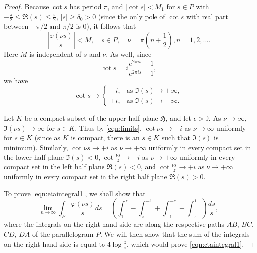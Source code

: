 \documentclass{article}
\begin{document}
\begin{proof}
Because $\cot{s}$ has period $\pi$, and $|\cot{s}|<M_1$ for $s\in P$ with $-\frac{\pi}{2} \leq \Re(s) \leq \frac{\pi}{2}$, $|s| \geq \delta_0>0$ (since the only pole of $\cot{s}$ with real part between $-\pi/2$ and $\pi/2$ is $0$), it follows that
\begin{equation}
\label{eqn:inequality}
|\frac{\varphi(\nu s)}{s}|<M, \quad s \in P, \quad \nu=\pi(n+\frac{1}{2}), n=1,2,\ldots.
\end{equation}
Here $M$ is independent of $s$ and $\nu$.
As well, since
\[
\cot s=i\frac{e^{2\pi is}+1}{e^{2\pi is}-1},
\]
we have
\begin{equation}
\label{eqn:limits}
\cot s \to \begin{cases}-i,&\textrm{as $\Im(s) \to +\infty$},\\
+i,&\textrm{as $\Im(s) \to -\infty$}.\end{cases}
\end{equation}

Let $K$ be a compact subset of the upper half plane $\mathfrak{H}$, and let $\epsilon>0$. As $\nu \to \infty$, $\Im(\nu s) \to \infty$ for $s \in K$. Thus by \eqref{eqn:limits}, $\cot \nu s \to -i$ as $\nu \to \infty$ uniformly for $s \in K$ (since as $K$ is compact, there is an $s \in K$ such that $\Im(s)$ is minimum). Similarly,
$\cot \nu s \to +i$ as $\nu \to +\infty$ uniformly in every compact set in the lower half plane $\Im(s)<0$,
$\cot \frac{\nu s}{z} \to -i$ as $\nu \to +\infty$ uniformly in every compact set in the left half plane $\Re(s)<0$, and $\cot \frac{\nu s}{z}\to +i$ as $\nu \to +\infty$ uniformly in every compact set in the right half plane $\Re(s)>0$.


To prove \eqref{eqn:etaintegral1}, we shall show that
\begin{equation}
\label{eqn:etaintegrals2}
\lim_{n \to \infty} \int_P \frac{\varphi(\nu s)}{s}ds=(\int_1^z  - \int_z^{-1}  + \int_{-1}^{-z}  - \int_{-z}^1) \frac{ds}{s},
\end{equation}
where the integrals on the right hand side are along the respective paths $AB$, $BC$, $CD$, $DA$ of the parallelogram $P$. We will then show that the sum of the integrals on the right hand side is equal to $4\log \frac{z}{i}$, which would prove \eqref{eqn:etaintegral1}.


\end{proof}
\end{document}
